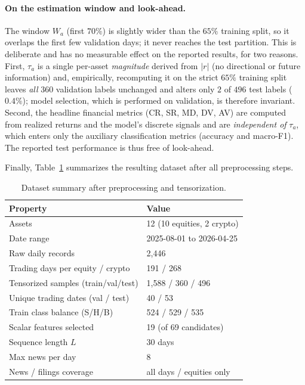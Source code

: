 \documentclass[runningheads]{llncs}
\begin{document}
\paragraph{On the estimation window and look-ahead.}
The window $W_a$ (first $70\%$) is slightly wider than the $65\%$ training split,
so it overlaps the first few validation days; it never reaches the test
partition. This is deliberate and has no measurable effect on the reported
results, for two reasons. First, $\tau_a$ is a single per-asset \emph{magnitude}
derived from $|r|$ (no directional or future information) and, empirically,
recomputing it on the strict $65\%$ training split leaves \emph{all} $360$
validation labels unchanged and alters only $2$ of $496$ test labels ($0.4\%$);
model selection, which is performed on validation, is therefore invariant.
Second, the headline financial metrics (CR, SR, MD, DV, AV) are computed from
realized returns and the model's discrete signals and are \emph{independent of}
$\tau_a$, which enters only the auxiliary classification metrics (accuracy and
macro-F1). The reported test performance is thus free of look-ahead.

Finally, Table~\ref{tab:dataset} summarizes the resulting dataset after all preprocessing
steps.

\begin{table}[t]
\centering
\caption{Dataset summary after preprocessing and tensorization.}
\label{tab:dataset}
\begin{tabular}{ll}
\toprule
Property & Value \\
\midrule
Assets & 12 (10 equities, 2 crypto) \\
Date range & 2025-08-01 to 2026-04-25 \\
Raw daily records & 2{,}446 \\
Trading days per equity / crypto & 191 / 268 \\
Tensorized samples (train/val/test) & 1{,}588 / 360 / 496 \\
Unique trading dates (val / test) & 40 / 53 \\
Train class balance (S/H/B) & 524 / 529 / 535 \\
Scalar features selected & 19 (of 69 candidates) \\
Sequence length $L$ & 30 days \\
Max news per day & 8 \\
News / filings coverage & all days / equities only \\
\bottomrule
\end{tabular}
\end{table}
\end{document}
